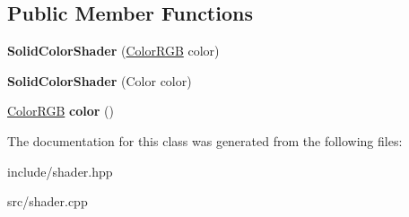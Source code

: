 \subsection*{Public Member Functions}
\begin{DoxyCompactItemize}
\item 
\hypertarget{classogls_1_1SolidColorShader_a7b87d06986b83421c7526e3a6f02f516}{{\bfseries Solid\-Color\-Shader} (\hyperlink{structogls_1_1ColorRGB}{Color\-R\-G\-B} color)}\label{classogls_1_1SolidColorShader_a7b87d06986b83421c7526e3a6f02f516}

\item 
\hypertarget{classogls_1_1SolidColorShader_afd557da82fc23157b9cbb07157f4fae2}{{\bfseries Solid\-Color\-Shader} (Color color)}\label{classogls_1_1SolidColorShader_afd557da82fc23157b9cbb07157f4fae2}

\item 
\hypertarget{classogls_1_1SolidColorShader_adaab2809e87c38d8233c2537bd15b503}{\hyperlink{structogls_1_1ColorRGB}{Color\-R\-G\-B} {\bfseries color} ()}\label{classogls_1_1SolidColorShader_adaab2809e87c38d8233c2537bd15b503}

\end{DoxyCompactItemize}


The documentation for this class was generated from the following files\-:\begin{DoxyCompactItemize}
\item 
include/shader.\-hpp\item 
src/shader.\-cpp\end{DoxyCompactItemize}
